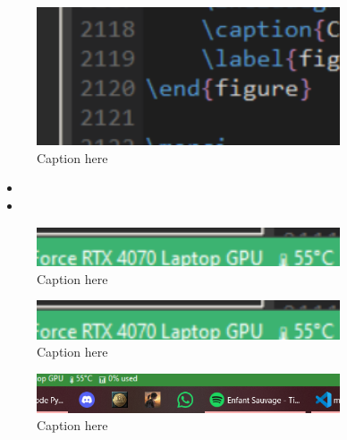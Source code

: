 \documentclass{mytex}
\begin{document}
\begin{figure}[h!]
    \centering
    \includegraphics[width=0.8\textwidth]{figures/Rendu_5/Le_nouveau_rendu_/default/fig4.png}
    \caption{Caption here}
    \label{fig:Rendu_5_Le_nouveau_rendu__4}
\end{figure}

\begin{itemize}
	\item
	\item
\end{itemize}



\begin{figure}[h!]
    \centering
    \includegraphics[width=0.8\textwidth]{figures/Rendu_5/Le_nouveau_rendu_/default/fig1.png}
    \caption{Caption here}
    \label{fig:Rendu_5_Le_nouveau_rendu__1}
\end{figure}


\begin{figure}[h!]
    \centering
    \includegraphics[width=0.8\textwidth]{figures/Rendu_5/Le_nouveau_rendu_/default/fig2.png}
    \caption{Caption here}
    \label{fig:Rendu_5_Le_nouveau_rendu__2}
\end{figure}


\begin{figure}[h!]
    \centering
    \includegraphics[width=0.8\textwidth]{figures/Rendu_5/Le_nouveau_rendu_/default/fig3.png}
    \caption{Caption here}
    \label{fig:Rendu_5_Le_nouveau_rendu__3}
\end{figure}

\merci
\end{document}
